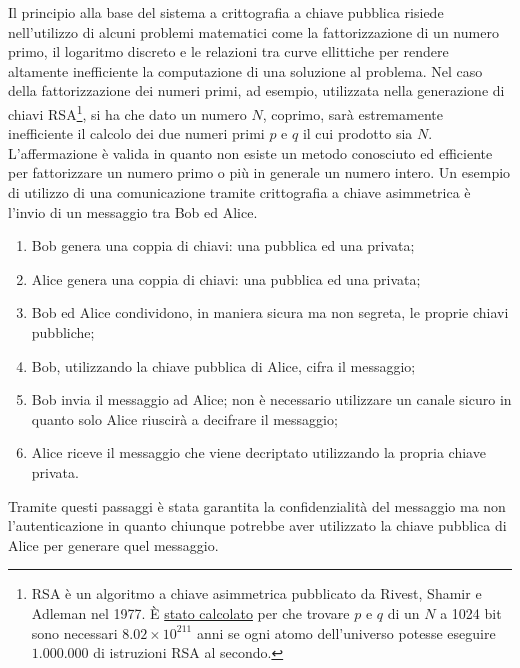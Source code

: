 Il principio alla base del sistema a crittografia a chiave pubblica risiede nell'utilizzo di alcuni problemi matematici come la fattorizzazione di un numero primo, il logaritmo discreto e le relazioni tra curve ellittiche per rendere altamente inefficiente la computazione di una soluzione al problema.\newline
Nel caso della fattorizzazione dei numeri primi, ad esempio, utilizzata nella generazione di chiavi RSA\footnote{RSA è un algoritmo a chiave asimmetrica pubblicato da Rivest, Shamir e Adleman nel 1977. È \href{https://slides.com/edoardorosa/breakingrsa#/2/5}{stato calcolato} per che trovare $p$ e $q$ di un $N$ a 1024 bit sono necessari $8.02\times 10^{211}$ anni se ogni atomo dell'universo potesse eseguire $1.000.000$ di istruzioni RSA al secondo.}, si ha che dato un numero $N$, coprimo, sarà estremamente inefficiente il calcolo dei due numeri primi $p$ e $q$ il cui prodotto sia $N$.
L'affermazione è valida in quanto non esiste un metodo conosciuto ed efficiente per fattorizzare un numero primo o più in generale un numero intero.\newline
Un esempio di utilizzo di una comunicazione tramite crittografia a chiave asimmetrica è l'invio di un messaggio tra Bob ed Alice.
\begin{enumerate}
    \item Bob genera una coppia di chiavi: una pubblica ed una privata;
    \item Alice genera una coppia di chiavi: una pubblica ed una privata;
    \item Bob ed Alice condividono, in maniera sicura ma non segreta, le proprie chiavi pubbliche;
    \item Bob, utilizzando la chiave pubblica di Alice, cifra il messaggio;
    \item Bob invia il messaggio ad Alice; non è necessario utilizzare un canale sicuro in quanto solo Alice riuscirà a decifrare il messaggio;
    \item Alice riceve il messaggio che viene decriptato utilizzando la propria chiave privata.
\end{enumerate}
Tramite questi passaggi è stata garantita la confidenzialità del messaggio ma non l'autenticazione in quanto chiunque potrebbe aver utilizzato la chiave pubblica di Alice per generare quel messaggio.
